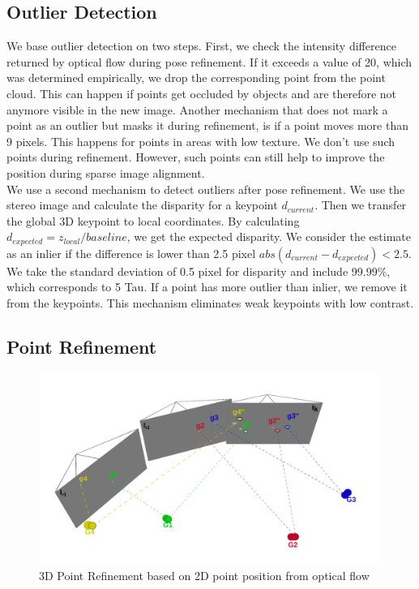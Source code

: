 \documentclass[11pt,a4paper,titlepage,oneside]{report}
\begin{document}
\subsection{Outlier Detection}
We base outlier detection on two steps. First, we check the intensity difference returned by optical flow during pose refinement. If it exceeds a value of 20, which was determined empirically, we drop the corresponding point from the point cloud. This can happen if points get occluded by objects and are therefore not anymore visible in the new image. Another mechanism that does not mark a point as an outlier but masks it during refinement, is if a point moves more than 9 pixels. This happens for points in areas with low texture. We don't use such points during refinement. However, such points can still help to improve the position during sparse image alignment.\\
We use a second mechanism to detect outliers after pose refinement. We use the stereo image and calculate the disparity for a keypoint $d_{current}$. Then we transfer the global 3D keypoint to local coordinates. By calculating $d_{expected}=z_{local}/baseline$, we get the expected disparity. We consider the estimate as an inlier if the difference is lower than 2.5 pixel $abs(d_{current}-d_{expected})<2.5$. We take the standard deviation of 0.5 pixel for disparity and include 99.99\%, which corresponds to 5 Tau. If a point has more outlier than inlier, we remove it from the keypoints. This mechanism eliminates weak keypoints with low contrast.

\subsection{Point Refinement}
\begin{figure}[H]
  \centering
  \includegraphics[width=0.99\textwidth]{img/pose_estimation_point_update.png}
  \caption{3D Point Refinement based on 2D point position from optical flow}
  \label{fig:point_update}
\end{figure}
\end{document}

